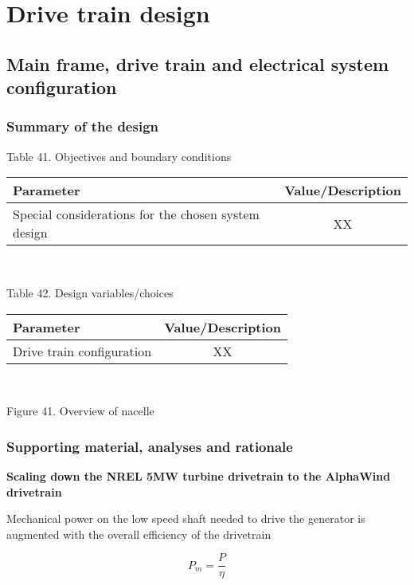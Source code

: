 \section{Drive train design}

\subsection{Main frame, drive train and electrical system configuration}

\subsubsection{Summary of the design}

\begin{center}
Table 41. Objectives and boundary conditions\\
\begin{tabular}{ |l|c| } 
\hline
\textbf{Parameter} & \textbf{Value/Description}  \\ 
\hline
Special considerations for the chosen system design & XX  \\ 
\hline
\end{tabular} \\
\end{center}

\begin{center}
Table 42. Design variables/choices\\
\begin{tabular}{ |l|c| } 
\hline
\textbf{Parameter} & \textbf{Value/Description}  \\ 
\hline
Drive train configuration & XX  \\ 
\hline
\end{tabular} \\
\end{center}

Figure 41. Overview of nacelle

\subsubsection{Supporting material, analyses and rationale}

\textbf{Scaling down the NREL 5MW turbine drivetrain to the AlphaWind drivetrain}

Mechanical power on the low speed shaft needed to drive the generator is augmented with the overall efficiency of the drivetrain 

\begin{equation}
    P_m = \dfrac{P}{\eta}
    \label{eq:P_m}
\end{equation}


